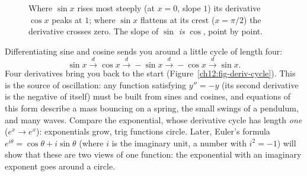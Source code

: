 \begin{figure}[H]
\centering
{}
\caption{Where $\sin x$ rises most steeply (at $x=0$, slope $1$) its
derivative $\cos x$ peaks at $1$; where $\sin x$ flattens at its crest
($x=\pi/2$) the derivative crosses zero. The slope of $\sin$ \emph{is}
$\cos$, point by point.}
\label{ch12:fig-sin-cos}
\end{figure}

\begin{aestheticbox}
Differentiating sine and cosine sends you around a little cycle of length
four:
\[
   \sin x \xrightarrow{\;d\;} \cos x \xrightarrow{\;d\;} -\sin x
   \xrightarrow{\;d\;} -\cos x \xrightarrow{\;d\;} \sin x.
\]
Four derivatives bring you back to the start
(Figure~\ref{ch12:fig-deriv-cycle}). This is the source of oscillation:
any function satisfying $y'' = -y$ (its second derivative is the negative of
itself) must be built from sines and cosines, and equations of this form
describe a mass bouncing on a spring, the small swings of a pendulum, and
many waves. Compare the
exponential, whose derivative cycle has length \emph{one} ($e^x\to e^x$):
exponentials grow, trig functions circle. Later, Euler's formula
$e^{i\theta}=\cos\theta + i\sin\theta$ (where $i$ is the imaginary unit, a
number with $i^2=-1$) will show that these are two views of one function: the
exponential with an imaginary exponent goes around a circle.
\end{aestheticbox}

